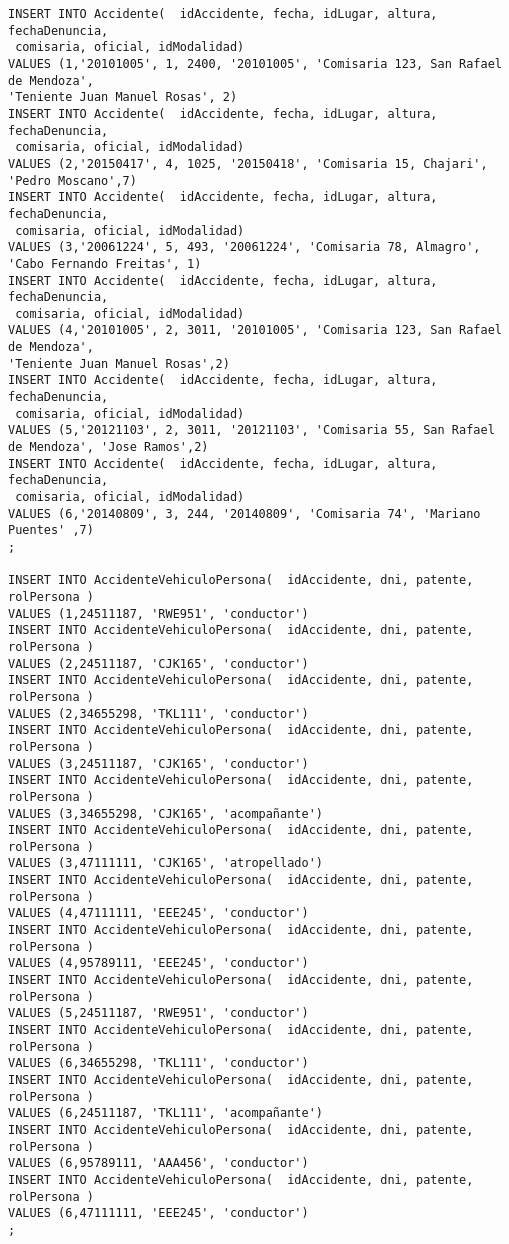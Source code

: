 {\begin{verbatim}
INSERT INTO Accidente(  idAccidente, fecha, idLugar, altura, fechaDenuncia,
 comisaria, oficial, idModalidad) 
VALUES (1,'20101005', 1, 2400, '20101005', 'Comisaria 123, San Rafael de Mendoza', 
'Teniente Juan Manuel Rosas', 2)
INSERT INTO Accidente(  idAccidente, fecha, idLugar, altura, fechaDenuncia,
 comisaria, oficial, idModalidad) 
VALUES (2,'20150417', 4, 1025, '20150418', 'Comisaria 15, Chajari', 'Pedro Moscano',7)
INSERT INTO Accidente(  idAccidente, fecha, idLugar, altura, fechaDenuncia,
 comisaria, oficial, idModalidad) 
VALUES (3,'20061224', 5, 493, '20061224', 'Comisaria 78, Almagro', 'Cabo Fernando Freitas', 1)
INSERT INTO Accidente(  idAccidente, fecha, idLugar, altura, fechaDenuncia,
 comisaria, oficial, idModalidad) 
VALUES (4,'20101005', 2, 3011, '20101005', 'Comisaria 123, San Rafael de Mendoza', 
'Teniente Juan Manuel Rosas',2)
INSERT INTO Accidente(  idAccidente, fecha, idLugar, altura, fechaDenuncia,
 comisaria, oficial, idModalidad) 
VALUES (5,'20121103', 2, 3011, '20121103', 'Comisaria 55, San Rafael de Mendoza', 'Jose Ramos',2)
INSERT INTO Accidente(  idAccidente, fecha, idLugar, altura, fechaDenuncia,
 comisaria, oficial, idModalidad) 
VALUES (6,'20140809', 3, 244, '20140809', 'Comisaria 74', 'Mariano Puentes' ,7)
;

INSERT INTO AccidenteVehiculoPersona(  idAccidente, dni, patente, rolPersona ) 
VALUES (1,24511187, 'RWE951', 'conductor')
INSERT INTO AccidenteVehiculoPersona(  idAccidente, dni, patente, rolPersona ) 
VALUES (2,24511187, 'CJK165', 'conductor')
INSERT INTO AccidenteVehiculoPersona(  idAccidente, dni, patente, rolPersona ) 
VALUES (2,34655298, 'TKL111', 'conductor')
INSERT INTO AccidenteVehiculoPersona(  idAccidente, dni, patente, rolPersona ) 
VALUES (3,24511187, 'CJK165', 'conductor')
INSERT INTO AccidenteVehiculoPersona(  idAccidente, dni, patente, rolPersona ) 
VALUES (3,34655298, 'CJK165', 'acompañante')
INSERT INTO AccidenteVehiculoPersona(  idAccidente, dni, patente, rolPersona ) 
VALUES (3,47111111, 'CJK165', 'atropellado')
INSERT INTO AccidenteVehiculoPersona(  idAccidente, dni, patente, rolPersona ) 
VALUES (4,47111111, 'EEE245', 'conductor')
INSERT INTO AccidenteVehiculoPersona(  idAccidente, dni, patente, rolPersona ) 
VALUES (4,95789111, 'EEE245', 'conductor')
INSERT INTO AccidenteVehiculoPersona(  idAccidente, dni, patente, rolPersona ) 
VALUES (5,24511187, 'RWE951', 'conductor')
INSERT INTO AccidenteVehiculoPersona(  idAccidente, dni, patente, rolPersona ) 
VALUES (6,34655298, 'TKL111', 'conductor')
INSERT INTO AccidenteVehiculoPersona(  idAccidente, dni, patente, rolPersona ) 
VALUES (6,24511187, 'TKL111', 'acompañante')
INSERT INTO AccidenteVehiculoPersona(  idAccidente, dni, patente, rolPersona ) 
VALUES (6,95789111, 'AAA456', 'conductor')
INSERT INTO AccidenteVehiculoPersona(  idAccidente, dni, patente, rolPersona ) 
VALUES (6,47111111, 'EEE245', 'conductor')
;


\end{verbatim}}
